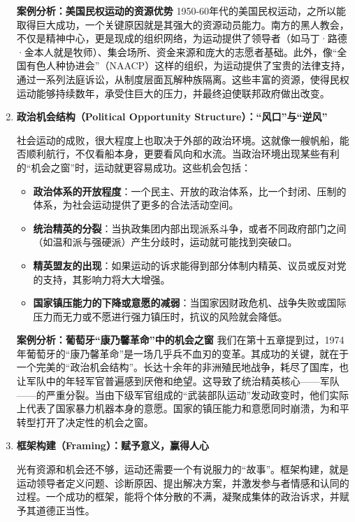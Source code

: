 \begin{enumerate}
    \textbf{案例分析：美国民权运动的资源优势}
    1950-60年代的美国民权运动，之所以能取得巨大成功，一个关键原因就是其强大的资源动员能力。南方的黑人教会，不仅是精神中心，更是现成的组织网络，为运动提供了领导者（如马丁·路德·金本人就是牧师）、集会场所、资金来源和庞大的志愿者基础。此外，像“全国有色人种协进会”（NAACP）这样的组织，为运动提供了宝贵的法律支持，通过一系列法庭诉讼，从制度层面瓦解种族隔离。这些丰富的资源，使得民权运动能够持续数年，承受住巨大的压力，并最终迫使联邦政府做出改变。

    \item \textbf{政治机会结构（Political Opportunity Structure）：“风口”与“逆风”}

    社会运动的成败，很大程度上也取决于外部的政治环境。这就像一艘帆船，能否顺利航行，不仅看船本身，更要看风向和水流。当政治环境出现某些有利的“机会之窗”时，运动就更容易成功。这些机会包括：

    \begin{itemize}
        \item \textbf{政治体系的开放程度}：一个民主、开放的政治体系，比一个封闭、压制的体系，为社会运动提供了更多的合法活动空间。
        \item \textbf{统治精英的分裂}：当执政集团内部出现派系斗争，或者不同政府部门之间（如温和派与强硬派）产生分歧时，运动就可能找到突破口。
        \item \textbf{精英盟友的出现}：如果运动的诉求能得到部分体制内精英、议员或反对党的支持，其影响力将大大增强。
        \item \textbf{国家镇压能力的下降或意愿的减弱}：当国家因财政危机、战争失败或国际压力而无力或不愿进行强力镇压时，抗议的风险就会降低。
    \end{itemize}

    \textbf{案例分析：葡萄牙“康乃馨革命”中的机会之窗}
    我们在第十五章提到过，1974年葡萄牙的“康乃馨革命”是一场几乎兵不血刃的变革。其成功的关键，就在于一个完美的“政治机会结构”。长达十余年的非洲殖民地战争，耗尽了国库，也让军队中的年轻军官普遍感到厌倦和绝望。这导致了统治精英核心——军队——的严重分裂。当由下级军官组成的“武装部队运动”发动政变时，他们实际上代表了国家暴力机器本身的意愿。国家的镇压能力和意愿同时崩溃，为和平转型打开了决定性的机会之窗。

    \item \textbf{框架构建（Framing）：赋予意义，赢得人心}

    光有资源和机会还不够，运动还需要一个有说服力的“故事”。框架构建，就是运动领导者定义问题、诊断原因、提出解决方案，并激发参与者情感和认同的过程。一个成功的框架，能将个体分散的不满，凝聚成集体的政治诉求，并赋予其道德正当性。


\end{enumerate}
